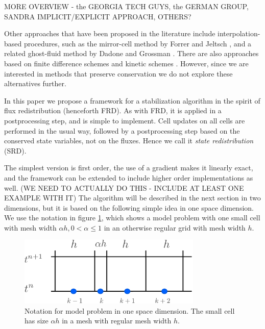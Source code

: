 MORE OVERVIEW - the GEORGIA TECH
GUYS, the GERMAN GROUP, SANDRA IMPLICIT/EXPLICIT APPROACH, OTHERS?

Other approaches that have been proposed in the literature include
interpolation-based procedures, such as the mirror-cell method by Forrer
and Jeltsch \cite{article:FoJe98}, and a related ghost-fluid method by
Dadone and Grossman \cite{DadoneGrossman}.
There are also approaches based on finite difference schemes
\cite{SjogreenPetersson,MarcoBjorn}
and kinetic schemes \cite{Oksuzoglu:thesis,KeenKarni}.
However, since we are interested in methods
that preserve conservation we do not explore these alternatives further.

In this paper we propose a framework for a stabilization algorithm in
the spirit of flux redistribution (henceforth FRD). 
As with FRD, it is applied in a postprocessing
step, and is simple to implement. Cell updates on all cells are performed
in the usual way, followed by a postprocessing step based on the
conserved state variables, not on the fluxes.
Hence we call it {\em state redistribution} (SRD).

The simplest version is first order,
the use of a gradient makes it linearly exact, and the framework can be
extended to include higher order implementations as well. (WE NEED TO
ACTUALLY DO THIS - INCLUDE AT LEAST ONE EXAMPLE WITH IT)
The algorithm will be described in the next section in two dimensions,
but it is based on the following simple idea in one space dimension.
We use the notation in  figure \ref{fig:modelProblem1}, which shows a
model problem with one
small cell with mesh width  $\alpha h, 0 < \alpha \leq 1$ in an
otherwise regular grid with mesh width $h$.

\begin{figure}
\begin{center}
\includegraphics[height=1.3in]{figs/1dfig.pdf}
\caption{\sf Notation for model problem in one space dimension. The small
cell has size $\alpha h$ in a mesh with regular mesh width $h$.}
\label{fig:modelProblem1}
\end{center}
\end{figure}

